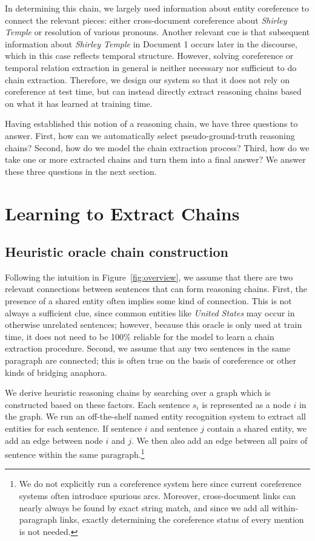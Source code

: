 \documentclass[11pt,a4paper]{article}
\begin{document}
In determining this chain, we largely used information about entity coreference to connect the relevant pieces: either cross-document coreference about \emph{Shirley Temple} or resolution of various pronouns. Another relevant cue is that subsequent information about \emph{Shirley Temple} in Document 1 occurs later in the discourse, which in this case reflects temporal structure. However, solving coreference or temporal relation extraction in general is neither necessary nor sufficient to do chain extraction. Therefore, we design our system so that it does not rely on coreference at test time, but can instead directly extract reasoning chains based on what it has learned at training time.

Having established this notion of a reasoning chain, we have three questions to answer. First, how can we automatically select pseudo-ground-truth reasoning chains? Second, how do we model the chain extraction process? Third, how do we take one or more extracted chains and turn them into a final answer? We answer these three questions in the next section.

\section{Learning to Extract Chains}

\subsection{Heuristic oracle chain construction}

Following the intuition in Figure~\ref{fig:overview}, we assume that there are two relevant connections between sentences that can form reasoning chains. First, the presence of a shared entity often implies some kind of connection. This is not always a sufficient clue, since common entities like \emph{United States} may occur in otherwise unrelated sentences; however, because this oracle is only used at train time, it does not need to be 100\% reliable for the model to learn a chain extraction procedure. Second, we assume that any two sentences in the same paragraph are connected; this is often true on the basis of coreference or other kinds of bridging anaphora.

We derive heuristic reasoning chains by searching over a graph which is constructed based on these factors. Each sentence $s_i$ is represented as a node $i$ in the graph. We run an off-the-shelf named entity recognition system to extract all entities for each sentence. If sentence $i$ and sentence $j$ contain a shared entity, we add an edge between node $i$ and $j$. We then also add an edge between all pairs of sentence within the same paragraph.\footnote{We do not explicitly run a coreference system here since current coreference systems often introduce spurious arcs. Moreover, cross-document links can nearly always be found by exact string match, and since we add all within-paragraph links, exactly determining the coreference status of every mention is not needed.}
\end{document}
